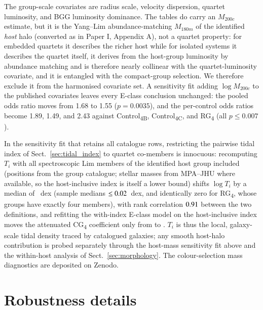 \documentclass{aa}
\newcommand{\CB}{Control\textsubscript{4B}}
\newcommand{\CC}{Control\textsubscript{4C}}
\newcommand{\CG}{CG\textsubscript{4}}
\newcommand{\RG}{RG\textsubscript{4}}
\begin{document}
\begin{appendix}
The group-scale covariates are radius scale, velocity dispersion, quartet luminosity, and BGG luminosity dominance. The tables do carry an \(M_{200c}\) estimate, but it is the Yang--Lim abundance-matching \(M_{180m}\) of the identified \emph{host} halo (converted as in Paper I, Appendix A), not a quartet property: for embedded quartets it describes the richer host while for isolated systems it describes the quartet itself, it derives from the host-group luminosity by abundance matching and is therefore nearly collinear with the quartet-luminosity covariate, and it is entangled with the compact-group selection. We therefore exclude it from the harmonised covariate set. A sensitivity fit adding \(\log M_{200c}\) to the published covariates leaves every E-class conclusion unchanged: the pooled odds ratio moves from 1.68 to 1.55 (\(p = 0.0035\)), and the per-control odds ratios become 1.89, 1.49, and 2.43 against \CB{}, \CC{}, and \RG{} (all \(p \le 0.007\)).


In the sensitivity fit that retains all catalogue rows, restricting the pairwise tidal index of Sect.~\ref{sec:tidal_index} to quartet co-members is innocuous: recomputing \(T_i\) with all spectroscopic Lim members of the identified host group included (positions from the group catalogue; stellar masses from MPA--JHU where available, so the host-inclusive index is itself a lower bound) shifts \(\log T_i\) by a median of \dTall~dex (sample medians \(\le 0.02\)~dex, and identically zero for \RG{}, whose groups have exactly four members), with rank correlation \(0.91\) between the two definitions, and refitting the with-index E-class model on the host-inclusive index moves the attenuated \CG{} coefficient only from \ORresid{} to \ORresidAll{}. \(T_i\) is thus the local, galaxy-scale tidal density traced by catalogued galaxies; any smooth host-halo contribution is probed separately through the host-mass sensitivity fit above and the within-host analysis of Sect.~\ref{sec:morphology}. The colour-selection mass diagnostics are deposited on Zenodo.


\raggedbottom
\section{Robustness details}\label{app:robustness_details}
\begingroup
\patchcmd{\paragraph}{-16dd}{-12dd}{}{}



\end{appendix}
\end{document}
